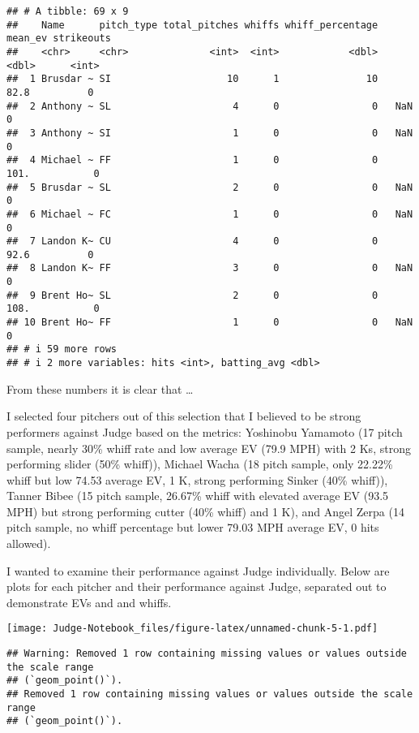 \documentclass[
]{article}
\begin{document}
\begin{verbatim}
## # A tibble: 69 x 9
##    Name      pitch_type total_pitches whiffs whiff_percentage mean_ev strikeouts
##    <chr>     <chr>              <int>  <int>            <dbl>   <dbl>      <int>
##  1 Brusdar ~ SI                    10      1               10    82.8          0
##  2 Anthony ~ SL                     4      0                0   NaN            0
##  3 Anthony ~ SI                     1      0                0   NaN            0
##  4 Michael ~ FF                     1      0                0   101.           0
##  5 Brusdar ~ SL                     2      0                0   NaN            0
##  6 Michael ~ FC                     1      0                0   NaN            0
##  7 Landon K~ CU                     4      0                0    92.6          0
##  8 Landon K~ FF                     3      0                0   NaN            0
##  9 Brent Ho~ SL                     2      0                0   108.           0
## 10 Brent Ho~ FF                     1      0                0   NaN            0
## # i 59 more rows
## # i 2 more variables: hits <int>, batting_avg <dbl>
\end{verbatim}

From these numbers it is clear that \ldots{}

I selected four pitchers out of this selection that I believed to be
strong performers against Judge based on the metrics: Yoshinobu Yamamoto
(17 pitch sample, nearly 30\% whiff rate and low average EV (79.9 MPH)
with 2 Ks, strong performing slider (50\% whiff)), Michael Wacha (18
pitch sample, only 22.22\% whiff but low 74.53 average EV, 1 K, strong
performing Sinker (40\% whiff)), Tanner Bibee (15 pitch sample, 26.67\%
whiff with elevated average EV (93.5 MPH) but strong performing cutter
(40\% whiff) and 1 K), and Angel Zerpa (14 pitch sample, no whiff
percentage but lower 79.03 MPH average EV, 0 hits allowed).

I wanted to examine their performance against Judge individually. Below
are plots for each pitcher and their performance against Judge,
separated out to demonstrate EVs and and whiffs.

\texttt{[image: Judge-Notebook\_files/figure-latex/unnamed-chunk-5-1.pdf]}

\begin{verbatim}
## Warning: Removed 1 row containing missing values or values outside the scale range
## (`geom_point()`).
## Removed 1 row containing missing values or values outside the scale range
## (`geom_point()`).
\end{verbatim}
\end{document}
